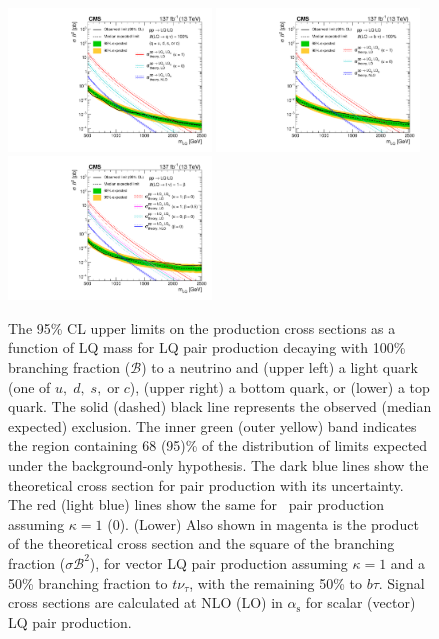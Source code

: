 \begin{figure}[htbp]
 \centering
   \includegraphics[width=0.48\textwidth]{figs/results/LQ_q.pdf}
   \includegraphics[width=0.48\textwidth]{figs/results/LQ_b.pdf}
   \includegraphics[width=0.48\textwidth]{figs/results/LQ_t.pdf}
   \caption{The 95\% CL upper limits on the production cross sections as a function of LQ mass
for LQ pair production decaying with 100\% branching fraction ($\mathcal{B}$) to a neutrino and (upper left) a light quark
(one of $u,\;d,\;s,\;\text{or}\;c$),
(upper right) a bottom quark, or (lower) a top quark.
The solid (dashed) black line represents the observed (median expected) exclusion.
The inner green (outer yellow) band indicates the region containing 68 (95)\%
of the distribution of limits expected under the background-only hypothesis.
The dark blue lines show the theoretical cross section for \lqs pair production with its uncertainty.
The red (light blue) lines show the same for \lqv\ pair production assuming $\kappa = 1$ (0).
(Lower) Also shown in magenta is the product of the theoretical cross section and the square of the branching fraction ($\sigma \mathcal{B}^{2}$),
for vector LQ pair production assuming $\kappa = 1$ and a 50\% branching fraction to $t\nu_\tau$, with the remaining 50\% to $b\tau$.
Signal cross sections are calculated at NLO (LO) in $\alpha_{\mathrm{s}}$ for scalar (vector) LQ pair production.}
   \label{fig:lq}
\end{figure}


